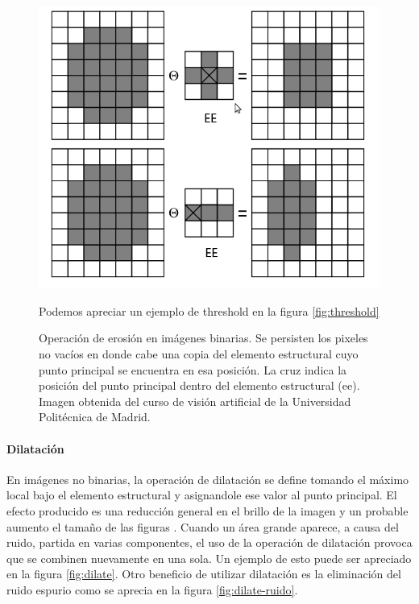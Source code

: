 \begin{figure}[tpb]
\begin{center}
  \includegraphics[scale=0.4]{figuras/erode-sample.png}
\end{center}Podemos apreciar un ejemplo de threshold en la figura \ref{fig:threshold}
  \caption{\small Operación de erosión en imágenes binarias. Se persisten los pixeles no vacíos en donde cabe una copia del elemento estructural cuyo punto principal se encuentra en esa posición. La cruz indica la posición del punto principal dentro del elemento estructural (ee). Imagen obtenida del curso de visión artificial de la Universidad Politécnica de Madrid. } 
  \label{fig:erode-sample}
\end{figure}

	\paragraph{Dilatación}
En imágenes no binarias, la operación de dilatación se define 
tomando el máximo local bajo el elemento estructural y asignandole ese valor al punto principal. El efecto producido es una reducción general en el brillo de la imagen y un probable aumento el tamaño de las figuras \cite{nasa-dilate-erode}.  Cuando un área grande aparece, a causa del ruido, partida en varias componentes, el uso de la operación de dilatación provoca que  se combinen nuevamente en una sola. Un ejemplo de esto puede ser apreciado en la figura \ref{fig:dilate}. Otro beneficio de utilizar dilatación es la eliminación del ruido espurio como se aprecia en la figura \ref{fig:dilate-ruido}.

